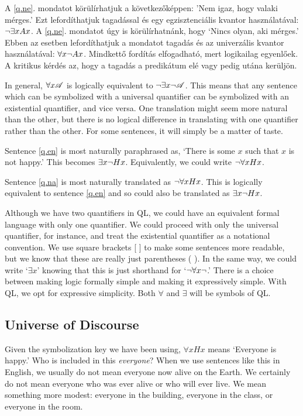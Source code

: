 A \ref{q.ne}. mondatot körülírhatjuk a következőképpen: ’Nem igaz, hogy valaki mérges.’ Ezt lefordíthatjuk tagadással és egy egzisztenciális kvantor használatával: $\neg \exists x Ax$. A \ref{q.ne}. mondatot úgy is körülírhatnánk, hogy ‘Nincs olyan, aki mérges.’ Ebben az esetben lefordíthatjuk a mondatot tagadás és az univerzális kvantor használatával: $\forall x \neg Ax$. Mindkettő fordítás elfogadható, mert logikailag egyenlőek. A kritikus kérdés az, hogy a tagadás a predikátum elé vagy pedig utána kerüljön.



In general, $\forall x\mathscr{A}$ is logically equivalent to $\neg\exists x\neg\mathscr{A}$. This means that any sentence which can be symbolized with a universal quantifier can be symbolized with an existential quantifier, and vice versa. One translation might seem more natural than the other, but there is no logical difference in translating with one quantifier rather than the other. For some sentences, it will simply be a matter of taste.

Sentence \ref{q.en} is most naturally paraphrased as, `There is some $x$ such that $x$ is not happy.' This becomes $\exists x \neg Hx$. Equivalently, we could write $\neg\forall x Hx$.

Sentence \ref{q.na} is most naturally translated as $\neg\forall xHx$. This is logically equivalent to sentence \ref{q.en} and so could also be translated as $\exists x \neg Hx$.

Although we have two quantifiers in QL, we could have an equivalent formal language with only one quantifier. We could proceed with only the universal quantifier, for instance, and treat the existential quantifier as a notational convention. We use square brackets [ ] to make some sentences more readable, but we know that these are really just parentheses ( ). In the same way, we could write `$\exists x$' knowing that this is just shorthand for `$\neg \forall x \neg$.' There is a choice between making logic formally simple and making it expressively simple. With QL, we opt for expressive simplicity. Both $\forall$ and $\exists$ will be symbols of QL.


\subsection{Universe of Discourse}
Given the symbolization key we have been using, $\forall xHx$ means `Everyone is happy.' Who is included in this \emph{everyone}? When we use sentences like this in English, we usually do not mean everyone now alive on the Earth. We certainly do not mean everyone who was ever alive or who will ever live. We mean something more modest: everyone in the building, everyone in the class, or everyone in the room.

